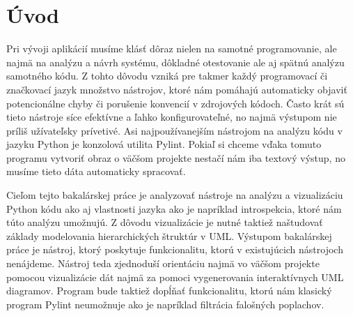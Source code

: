 \documentclass[11pt,oneside,final]{fithesis2}
\begin{document}
 \FrontMatter  
 \ThesisTitlePage

\begin{ThesisDeclaration}
\DeclarationText
\AdvisorName
\end{ThesisDeclaration}

\begin{ThesisThanks}
\end{ThesisThanks}

\begin{ThesisAbstract}
\end{ThesisAbstract}

\begin{ThesisKeyWords}
\end{ThesisKeyWords}



\MainMatter  
\tableofcontents

\chapter{Úvod}

	Pri vývoji aplikácií musíme klásť dôraz nielen na samotné programovanie, ale najmä na analýzu a návrh systému, dôkladné otestovanie ale aj spätnú analýzu samotného kódu. Z tohto dôvodu vzniká pre takmer každý programovací či značkovací jazyk množstvo nástrojov, ktoré nám pomáhajú automaticky objaviť potencionálne chyby či porušenie konvencií v zdrojových kódoch. Často krát sú tieto nástroje síce efektívne a ľahko konfigurovateľné, no najmä výstupom nie príliš užívateľsky prívetivé. Asi najpoužívanejším nástrojom na analýzu kódu v jazyku Python je konzolová utilita Pylint. Pokiaľ si chceme vďaka tomuto programu vytvoriť obraz o väčšom projekte nestačí nám iba textový výstup, no musíme tieto dáta automaticky spracovať.
	
	Cieľom tejto bakalárskej práce je analyzovať nástroje na analýzu a vizualizáciu Python kódu ako aj vlastnosti jazyka ako je napríklad introspekcia, ktoré nám túto analýzu umožnujú. Z dôvodu vizualizácie je nutné taktiež naštudovať základy modelovania hierarchických štruktúr v UML. Výstupom bakalárskej práce je nástroj, ktorý poskytuje funkcionalitu, ktorú v existujúcich nástrojoch nenájdeme. Nástroj teda zjednoduší orientáciu najmä vo väčšom projekte pomocou vizualizácie dát najmä za pomoci vygenerovania interaktívnych UML diagramov. Program bude taktiež dopĺňať funkcionalitu, ktorú nám klasický program Pylint neumožnuje ako je napríklad filtrácia falošných poplachov. 
\end{document}
